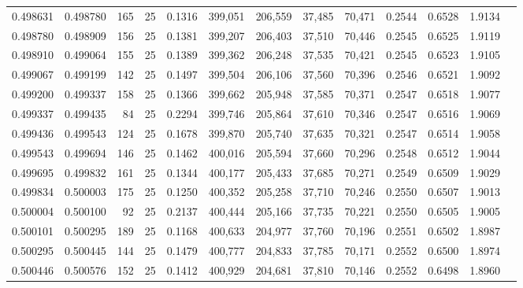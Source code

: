 \begin{tabular}{rrrrrrrrrrrrr}
0.498631 & 0.498780 &   165 &  25 &                                     0.1316 & 399,051 & 206,559 &  37,485 &  70,471 & 0.2544 & 0.6528 & 1.9134 \\
0.498780 & 0.498909 &   156 &  25 &                                     0.1381 & 399,207 & 206,403 &  37,510 &  70,446 & 0.2545 & 0.6525 & 1.9119 \\
0.498910 & 0.499064 &   155 &  25 &                                     0.1389 & 399,362 & 206,248 &  37,535 &  70,421 & 0.2545 & 0.6523 & 1.9105 \\
0.499067 & 0.499199 &   142 &  25 &                                     0.1497 & 399,504 & 206,106 &  37,560 &  70,396 & 0.2546 & 0.6521 & 1.9092 \\
0.499200 & 0.499337 &   158 &  25 &                                     0.1366 & 399,662 & 205,948 &  37,585 &  70,371 & 0.2547 & 0.6518 & 1.9077 \\
0.499337 & 0.499435 &    84 &  25 &                                     0.2294 & 399,746 & 205,864 &  37,610 &  70,346 & 0.2547 & 0.6516 & 1.9069 \\
0.499436 & 0.499543 &   124 &  25 &                                     0.1678 & 399,870 & 205,740 &  37,635 &  70,321 & 0.2547 & 0.6514 & 1.9058 \\
0.499543 & 0.499694 &   146 &  25 &                                     0.1462 & 400,016 & 205,594 &  37,660 &  70,296 & 0.2548 & 0.6512 & 1.9044 \\
0.499695 & 0.499832 &   161 &  25 &                                     0.1344 & 400,177 & 205,433 &  37,685 &  70,271 & 0.2549 & 0.6509 & 1.9029 \\
0.499834 & 0.500003 &   175 &  25 &                                     0.1250 & 400,352 & 205,258 &  37,710 &  70,246 & 0.2550 & 0.6507 & 1.9013 \\
0.500004 & 0.500100 &    92 &  25 &                                     0.2137 & 400,444 & 205,166 &  37,735 &  70,221 & 0.2550 & 0.6505 & 1.9005 \\
0.500101 & 0.500295 &   189 &  25 &                                     0.1168 & 400,633 & 204,977 &  37,760 &  70,196 & 0.2551 & 0.6502 & 1.8987 \\
0.500295 & 0.500445 &   144 &  25 &                                     0.1479 & 400,777 & 204,833 &  37,785 &  70,171 & 0.2552 & 0.6500 & 1.8974 \\
0.500446 & 0.500576 &   152 &  25 &                                     0.1412 & 400,929 & 204,681 &  37,810 &  70,146 & 0.2552 & 0.6498 & 1.8960 \\

\end{tabular}
